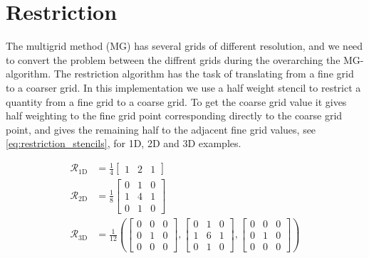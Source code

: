 

\section{Restriction}
	\label{sec:restr_imple}
	The multigrid method (MG) has several grids of different resolution, and we need to
 	convert the problem between the diffrent grids during the overarching the MG-algorithm.
 	The restriction algorithm has the task of translating from a fine grid to a coarser grid.
	In this implementation we use a half weight stencil to restrict a quantity from a fine
	grid to a coarse grid. To get the coarse grid value it gives half weighting to
	the fine grid point corresponding directly to the coarse grid point, and gives the remaining
	half to the adjacent fine grid values, see \eqref{eq:restriction_stencils}, for 1D,
	2D and 3D examples.

	\begin{equation}
		\begin{aligned}
			\mathcal{R}_{1\text{D}} &= \frac{1}{4}
			\begin{bmatrix}
				1 & 2 & 1
			\end{bmatrix}
			\\
			\mathcal{R}_{2\text{D}} &= \frac{1}{8}
			\begin{bmatrix}
				0 & 1 & 0
				\\
				1 & 4 & 1
				\\
				0 & 1 & 0
			\end{bmatrix}
			\\
			\mathcal{R}_{3\text{D}} &= \frac{1}{12} \left(
			\begin{bmatrix}
				0 & 0 & 0
				\\
				0 & 1 & 0
				\\
				0 & 0 & 0
			\end{bmatrix}
			,
			\begin{bmatrix}
				0 & 1 & 0
				\\
				1 & 6 & 1
				\\
				0 & 1 & 0
			\end{bmatrix}
			,
			\begin{bmatrix}
				0 & 0 & 0
				\\
				0 & 1 & 0
				\\
				0 & 0 & 0
			\end{bmatrix}
			\right)
			\label{eq:restriction_stencils}
		\end{aligned}
	\end{equation}

